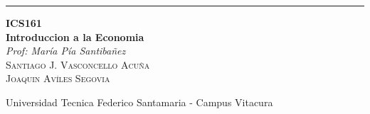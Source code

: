 
\begin{titlepage} %

	\raggedleft %

	\rule{1pt}{\textheight} %
	\hspace{0.05\textwidth} %
	\parbox[b]{0.75\textwidth}{ %

	{\Huge\bfseries ICS161 \\[0.5\baselineskip] Introduccion a la Economia}\\[2\baselineskip] %
	{\large\textit{Prof: María Pía Santibañez}}\\[4\baselineskip] %
	{\Large\textsc{Santiago J. Vasconcello Acuña\\Joaquin Avíles Segovia}} %

	\vspace{0.5\textheight} %

	{\noindent Universidad Tecnica Federico Santamaria - Campus Vitacura}\\[\baselineskip] %
	}

\end{titlepage}

